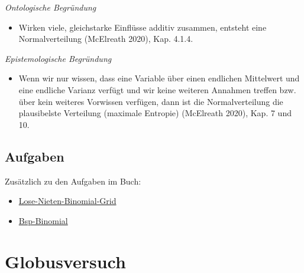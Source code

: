 \documentclass[
  a4paper,
  DIV=11]{scrreprt}
\providecommand{\tightlist}{%
  \setlength{\itemsep}{0pt}\setlength{\parskip}{0pt}}\usepackage{longtable,booktabs,array}
\theoremstyle{definition}
\theoremstyle{remark}
\begin{document}
\begin{tcolorbox}[enhanced jigsaw, leftrule=.75mm, toptitle=1mm, bottomtitle=1mm, titlerule=0mm, breakable, colframe=quarto-callout-note-color-frame, title=\textcolor{quarto-callout-note-color}{\faInfo}\hspace{0.5em}{Hinweis}, rightrule=.15mm, colback=white, arc=.35mm, left=2mm, bottomrule=.15mm, coltitle=black, opacitybacktitle=0.6, toprule=.15mm, colbacktitle=quarto-callout-note-color!10!white, opacityback=0]

\emph{Ontologische Begründung}

\begin{itemize}
\tightlist
\item
  Wirken viele, gleichstarke Einflüsse additiv zusammen, entsteht eine
  Normalverteilung (McElreath 2020), Kap. 4.1.4.
\end{itemize}

\emph{Epistemologische Begründung}

\begin{itemize}
\tightlist
\item
  Wenn wir nur wissen, dass eine Variable über einen endlichen
  Mittelwert und eine endliche Varianz verfügt und wir keine weiteren
  Annahmen treffen bzw. über kein weiteres Vorwissen verfügen, dann ist
  die Normalverteilung die plausibelste Verteilung (maximale Entropie)
  (McElreath 2020), Kap. 7 und 10.
\end{itemize}

\end{tcolorbox}

\hypertarget{aufgaben-2}{%
\section{Aufgaben}\label{aufgaben-2}}

Zusätzlich zu den Aufgaben im Buch:

\begin{itemize}
\tightlist
\item
  \href{https://datenwerk.netlify.app/posts/lose-nieten-binomial-grid/lose-nieten-binomial-grid}{Lose-Nieten-Binomial-Grid}
\item
  \href{https://datenwerk.netlify.app/posts/bsp-binomial/bsp-binomial}{Bsp-Binomial}
\end{itemize}


\hypertarget{globusversuch}{%
\chapter{Globusversuch}\label{globusversuch}}
\end{document}
